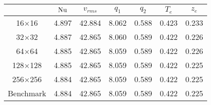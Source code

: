 \begin{tabular}{c|cccccc}
    & $\mathrm{Nu}$ & $v_{rms}$ & $q_1$ & $q_2$ & $T_{e}$ & $z_{e}$ \\
\hline
16$\times$16 & 4.897 & 42.884 & 8.062 & 0.588 & 0.423 & 0.233 \\
32$\times$32 & 4.887 & 42.865 & 8.060 & 0.589 & 0.422 & 0.226 \\
64$\times$64 & 4.885 & 42.865 & 8.059 & 0.589 & 0.422 & 0.226 \\
128$\times$128 & 4.885 & 42.865 & 8.059 & 0.589 & 0.422 & 0.225 \\
256$\times$256 & 4.884 & 42.865 & 8.059 & 0.589 & 0.422 & 0.225 \\
\hline
Benchmark & 4.884 & 42.865 & 8.059 & 0.589 & 0.422 & 0.225 \\
\end{tabular}
